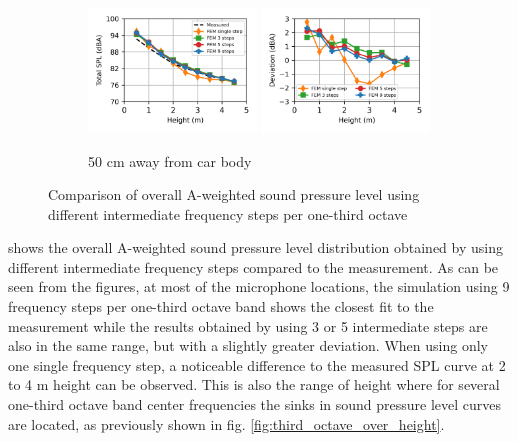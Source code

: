 \begin{figure}[H]\ContinuedFloat
	\begin{subfigure}[b]{\textwidth}
		\centering
		\includegraphics[width=0.49\textwidth]{fig/chap5/freq_steps/overall_SPL/pos_f.png}
		\includegraphics[width=0.49\textwidth]{fig/chap5/freq_steps/overall_SPL/pos_f_deviation.png}
		\caption{50 cm away from car body}
	\end{subfigure}
	\caption{Comparison of overall A-weighted sound pressure level using different intermediate frequency steps per one-third octave}
	\label{fig:overall_SPL_freq_steps}
\end{figure}

\noindent{} shows the overall A-weighted sound pressure level distribution obtained by using different intermediate frequency steps compared to the measurement. %
As can be seen from the figures, at most of the microphone locations, the simulation using 9 frequency steps per one-third octave band shows the closest fit to the measurement while the results obtained by using 3 or 5 intermediate steps are also in the same range, but with a slightly greater deviation. When using only one single frequency step, a noticeable difference to the measured SPL curve at 2 to 4 m height can be observed. This is also the range of height where for several one-third octave band center frequencies the sinks in sound pressure level curves are located, as previously shown in fig. \ref{fig:third_octave_over_height}.

